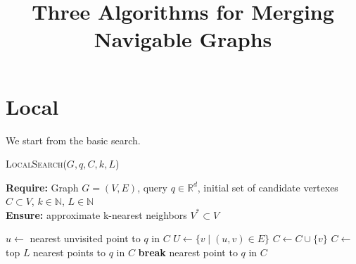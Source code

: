 \documentclass{article}
\title{Three Algorithms for Merging Navigable Graphs}
\author{}
\date{}
\begin{document}
\maketitle

\section {Local}



We start from the basic search. 

\begin{algorithm}
\caption{\textsc{LocalSearch}($G, q, C, k, L$)}\label{alg:local_search}
\textbf{Require:} Graph $G = (V, E)$, query $q \in \mathbb{R}^d$, initial set of candidate vertexes $C \subset V$,  $k \in \mathbb{N}$, $L \in \mathbb{N}$ \\
\textbf{Ensure:} approximate k-nearest neighbors $V^* \subset V$
\begin{algorithmic}[1]
    \State $u \gets$ nearest unvisited point to $q$ in $C$
    \State $U \gets \{v \mid (u, v) \in E\}$
            \State $C \gets C \cup \{v\}$
        \EndIf
    \EndFor
        \State $C \gets$ top $L$ nearest points to $q$ in $C$
    \EndIf
        \State \textbf{break}
    \EndIf
\EndWhile
\State \Return nearest point to $q$ in $C$
\end{algorithmic}
\end{algorithm}
\end{document}
